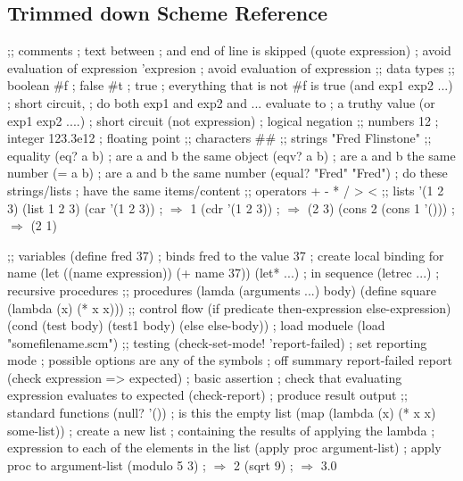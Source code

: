 \documentclass[10pt,a4paper,landscape,english,twoside]{article}
\begin{document}
\begin{multicols}{2}
\section*{Trimmed down Scheme Reference}
\begin{schemecode}
;; comments
; text between ; and end of line is skipped
(quote expression) ; avoid evaluation of expression
'expresion ; avoid evaluation of expression
;; data types
;; boolean
#f ; false
#t ; true ; everything that is not #f is true
(and exp1 exp2 ...) ; short circuit, 
; do both exp1 and exp2 and ...  evaluate to 
; a truthy value
(or exp1 exp2 ....) ; short circuit
(not expression) ; logical negation
;; numbers
12 ; integer
123.3e12 ; floating point
;; characters
#\a #\newline
;; strings
"Fred Flinstone"
;; equality
(eq? a b) ; are a and b the same object
(eqv? a b) ; are a and b the same number
(= a b) ; are a and b the same number
(equal? "Fred" "Fred") ; do these strings/lists 
; have the same items/content 
;; operators
+ - * / > <
;; lists
'(1 2 3)
(list 1 2 3)
(car '(1 2 3)) ; $\Rightarrow$ 1
(cdr '(1 2 3)) ; $\Rightarrow$ (2 3)
(cons 2 (cons 1 '())) ; $\Rightarrow$ (2 1)
\end{schemecode}
\vfill
\columnbreak
\begin{schemecode}
;; variables
(define fred 37) ; binds fred to the value 37
; create local binding for name
(let ((name expression)) (+ name 37)) 
(let* ...) ; in sequence
(letrec ...) ; recursive procedures
;; procedures
(lamda (arguments ...) body)
(define square (lambda (x) (* x x)))
;; control flow
(if predicate then-expression else-expression)
(cond (test body)
  (test1 body)
  (else else-body))
; load moduele
(load "somefilename.scm")
;; testing 
(check-set-mode! 'report-failed) ; set reporting mode
; possible options are any of the symbols 
; off summary report-failed report 
(check expression => expected) ; basic assertion 
; check that evaluating expression evaluates to expected
(check-report) ; produce result output
;; standard functions
(null? '()) ; is this the empty list
(map (lambda (x) (* x x) some-list)) ; create a new list 
; containing the results of applying the lambda 
; expression to each of the elements in the list
(apply proc argument-list) ; apply proc to argument-list
(modulo 5 3) ; $\Rightarrow$ 2
(sqrt 9) ; $\Rightarrow$ 3.0
\end{schemecode}
\end{multicols}
\end{document}
